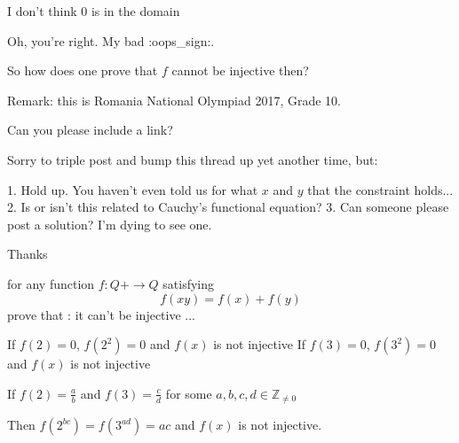 \begin{solution}
	\begin{tcolorbox}
I don't think $0$ is in the domain\end{tcolorbox}

Oh, you're right. My bad :oops_sign:. 

So how does one prove that $f$ cannot be injective then?
\end{solution}



\begin{solution}
	\begin{tcolorbox}Remark: this is Romania National Olympiad 2017, Grade 10.\end{tcolorbox}

Can you please include a link? 
\end{solution}



\begin{solution}
	Sorry to triple post and bump this thread up yet another time, but:

1. Hold up. You haven't even told us for what $x$ and $y$ that the constraint holds...
2. Is or isn't this related to Cauchy's functional equation?
3. Can someone please post a solution? I'm dying to see one.

Thanks
\end{solution}



\begin{solution}
	\begin{tcolorbox}for any function $f:Q+\longrightarrow Q $ satisfying $$f(xy)=f(x)+f(y)$$ prove that : it can't be injective ...\end{tcolorbox}
If $f(2)=0$, $f(2^2)=0$ and $f(x)$ is not injective
If $f(3)=0$, $f(3^2)=0$ and $f(x)$ is not injective

If $f(2)=\frac ab$ and $f(3)=\frac cd$ for some $a,b,c,d\in\mathbb Z_{\ne 0}$

Then $f(2^{bc})=f(3^{ad})=ac$ and $f(x)$ is not injective.


\end{solution}



